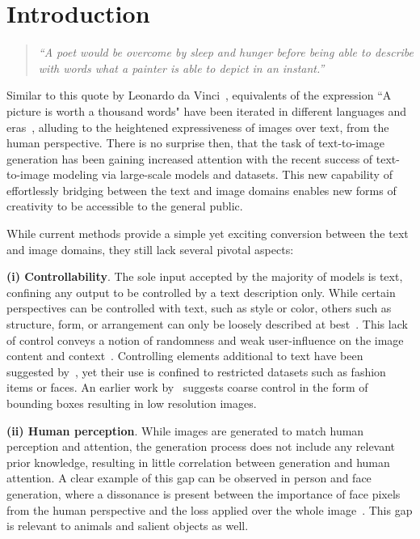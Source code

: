 \documentclass[final]{cvpr}
\begin{document}
\vspace{-0.5cm}
\section{Introduction}
\begin{quote}
    \centering\textit{``A poet would be overcome by sleep and hunger before being able to describe with words what a painter is able to depict in an instant.''}
\end{quote} 

Similar to this quote by Leonardo da Vinci~\cite{janson1991history}, equivalents of the expression ``A picture is worth a thousand words" have been iterated in different languages and eras~\cite{fourcade1968arche,advice1911syracuse,ivan2017fathers}, alluding to the heightened expressiveness of images over text, from the human perspective. There is no surprise then, that the task of text-to-image generation has been gaining increased attention with the recent success of text-to-image modeling via large-scale models and datasets. This new capability of effortlessly bridging between the text and image domains enables new forms of creativity to be accessible to the general public. 

While current methods provide a simple yet exciting conversion between the text and image domains, they still lack several pivotal aspects: 

{\textbf{(i) Controllability}}. The sole input accepted by the majority of models is text, confining any output to be controlled by a text description only. While certain perspectives can be controlled with text, such as style or color, others such as structure, form, or arrangement can only be loosely described at best~\cite{dalleSpotlight}. This lack of control conveys a notion of randomness and weak user-influence on the image content and context~\cite{li2019controllable}. Controlling elements additional to text have been suggested by~\cite{zhang2021m6}, yet their use is confined to restricted datasets such as fashion items or faces. An earlier work by~\cite{hong2018inferring} suggests coarse control in the form of bounding boxes resulting in low resolution images.

{\textbf{(ii) Human perception}}. While images are generated to match human perception and attention, the generation process does not include any relevant prior knowledge, resulting in little correlation between generation and human attention. A clear example of this gap can be observed in person and face generation, where a dissonance is present between the importance of face pixels from the human perspective and the loss applied over the whole image~\cite{judd2012benchmark,yun2013studying}. This gap is relevant to animals and salient objects as well. 
\end{document}
